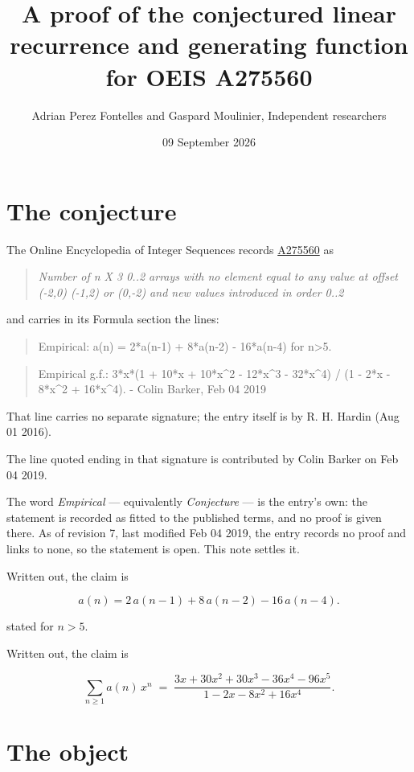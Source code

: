 \documentclass[11pt]{article}
\title{A proof of the conjectured linear recurrence and generating function for OEIS A275560}
\author{Adrian Perez Fontelles and Gaspard Moulinier, Independent researchers}
\date{09 September 2026}
\theoremstyle{definition}
\begin{document}
\maketitle
\section{The conjecture}

The Online Encyclopedia of Integer Sequences records \href{https://oeis.org/A275560}{A275560} as

\begin{quote}\itshape Number of n X 3 0..2 arrays with no element equal to any value at offset (-2,0) (-1,2) or (0,-2) and new values introduced in order 0..2\end{quote}

and carries in its Formula section the lines:

\begin{quote}\ttfamily Empirical: a(n) = 2*a(n-1) + 8*a(n-2) - 16*a(n-4) for n>5.\end{quote}

\begin{quote}\ttfamily Empirical g.f.: 3*x*(1 + 10*x + 10*x\textasciicircum{}2 - 12*x\textasciicircum{}3 - 32*x\textasciicircum{}4) / (1 - 2*x - 8*x\textasciicircum{}2 + 16*x\textasciicircum{}4). - Colin Barker, Feb 04 2019\end{quote}

That line carries no separate signature; the entry itself is by R. H. Hardin (Aug 01 2016).

The line quoted ending in that signature is contributed by Colin Barker on Feb 04 2019.

The word {\itshape Empirical} --- equivalently {\itshape Conjecture} --- is the entry's own: the statement is recorded as fitted to the published terms, and no proof is given there. As of revision 7, last modified Feb 04 2019, the entry records no proof and links to none, so the statement is open. This note settles it.

Written out, the claim is

\[a(n) = 2\,a(n-1) + 8\,a(n-2) - 16\,a(n-4).\]

stated for $n > 5$.

Written out, the claim is

\[\sum_{n \ge 1} a(n)\,x^n \;=\; \frac{3x + 30x^{2} + 30x^{3} - 36x^{4} - 96x^{5}}{1 - 2x - 8x^{2} + 16x^{4}}.\]

\section{The object}
\end{document}
